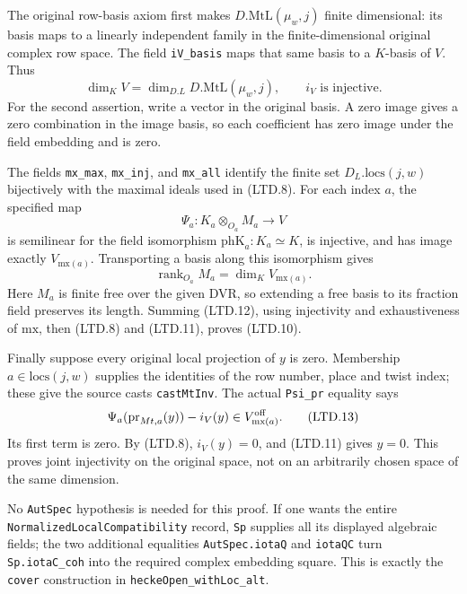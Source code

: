 The original row-basis axiom first makes
\(D.\mathrm{MtL}(\mu_w,j)\) finite dimensional: its basis maps
to a linearly independent family in the finite-dimensional
original complex row space.  The field \texttt{iV\_basis} maps
that same basis to a \(K\)-basis of \(V\).  Thus
\[
 \dim_KV=\dim_{D.L}D.\mathrm{MtL}(\mu_w,j),\qquad
                 i_V\text{ is injective}.                         \tag{LTD.11}
\]
For the second assertion, write a vector in the original basis.
A zero image gives a zero combination in the image basis, so
each coefficient has zero image under the field embedding and
is zero.

The fields \texttt{mx\_max}, \texttt{mx\_inj}, and
\texttt{mx\_all} identify the finite set
\(D_L.\mathrm{locs}(j,w)\) bijectively with the maximal ideals
used in (LTD.8).  For each index \(a\), the specified map
\[
 \Psi_a:K_a\otimes_{O_a}M_a\longrightarrow V
\]
is semilinear for the field isomorphism \(\mathrm{phK}_a:K_a\simeq K\),
is injective, and has image exactly \(V_{\mathrm{mx}(a)}\).
Transporting a basis along this isomorphism gives
\[
 \operatorname{rank}_{O_a}M_a
       =\dim_KV_{\mathrm{mx}(a)}.                                 \tag{LTD.12}
\]
Here \(M_a\) is finite free over the given DVR, so extending a
free basis to its fraction field preserves its length.
Summing (LTD.12), using injectivity and exhaustiveness of
\(\mathrm{mx}\), then (LTD.8) and (LTD.11), proves (LTD.10).

Finally suppose every original local projection of \(y\) is
zero.  Membership \(a\in\mathrm{locs}(j,w)\) supplies the
identities of the row number, place and twist index; these give
the source casts \texttt{castMtInv}.  The actual
\texttt{Psi\_pr} equality says
\[
 \Psi_a(\mathrm{pr}_{Mt,a}(y))-i_V(y)
                    \in V^{\rm off}_{\mathrm{mx}(a)}.
 \tag{LTD.13}
\]
Its first term is zero.  By (LTD.8), \(i_V(y)=0\), and (LTD.11)
gives \(y=0\).  This proves joint injectivity on the original
space, not on an arbitrarily chosen space of the same dimension.

No \texttt{AutSpec} hypothesis is needed for this proof.
If one wants the entire \texttt{NormalizedLocal}\allowbreak\texttt{Compatibility}
record, \texttt{Sp} supplies all its displayed algebraic fields;
the two additional equalities \texttt{AutSpec.iotaQ} and
\texttt{iotaQC} turn \texttt{Sp.iotaC\_coh} into the required
complex embedding square.  This is exactly the \texttt{cover}
construction in \texttt{heckeOpen\_withLoc\_alt}.

